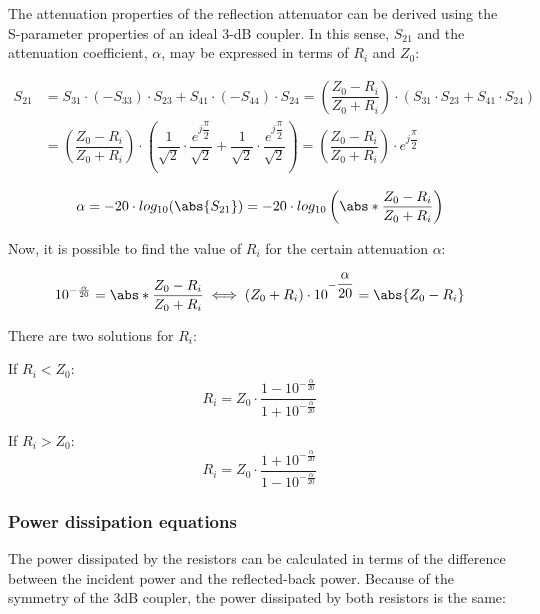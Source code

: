 \noindent The attenuation properties of the reflection attenuator can be derived using the S-parameter properties of an ideal 3-dB coupler. In this sense, $S_{21}$ and the attenuation coefficient, $\alpha$, may be expressed in terms of $R_i$ and $Z_0$:


\begin{align}
S_{21} & = S_{31} \cdot (-S_{33}) \cdot S_{23} + S_{41} \cdot (-S_{44}) \cdot S_{24} = \left( \dfrac{Z_0 - R_i}{Z_0 + R_i} \right) \cdot (S_{31} \cdot S_{23} + S_{41} \cdot S_{24}) \\
 & = \left( \dfrac{Z_0 - R_i}{Z_0 + R_i} \right) \cdot \left( \dfrac{1}{\sqrt{2}} \cdot \dfrac{e^{j \dfrac{\pi}{2}}}{\sqrt{2}} + \dfrac{1}{\sqrt{2}} \cdot \dfrac{e^{j \dfrac{\pi}{2}}}{\sqrt{2}} \right) = \left( \dfrac{Z_{0} - R_{i}}{Z_{0} + R_{i}}\right) \cdot e^{j\dfrac{\pi}{2}}
\end{align}


\begin{equation}
\alpha = -20\cdot log_{10} (\abs{S_{21}}) = -20\cdot log_{10} \left(\abs*{\dfrac{Z_0 - R_i}{Z_0 + R_i}} \right)
\end{equation}

\noindent Now, it is possible to find the value of $R_{i}$ for the certain attenuation $\alpha$:

\begin{equation}
10^{-\frac{\alpha}{20}} = \abs*{\dfrac{Z_0 - R_i}{Z_0 + R_i}} \iff (Z_0 + R_i) \cdot 10^{-\dfrac{\alpha}{20}} = \abs{Z_{0} - R_i}
\end{equation}

\nointent There are two solutions for $R_i$:
\bigskip

\noindent If $R_i < Z_0$:
\begin{equation}
R_i = Z_0 \cdot \dfrac{1 - 10^{-\frac{\alpha}{20}}}{1 + 10^{-\frac{\alpha}{20}}}
\end{equation}

\noindent If $R_i > Z_0$:
\begin{equation}
R_i = Z_0 \cdot \dfrac{1 + 10^{-\frac{\alpha}{20}}}{1 - 10^{-\frac{\alpha}{20}}}
\end{equation}

\subsubsection{Power dissipation equations}

The power dissipated by the resistors can be calculated in terms of the difference between the incident power and the reflected-back power.
Because of the symmetry of the 3dB coupler, the power dissipated by both resistors is the same:

